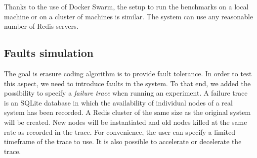 Thanks to the use of Docker Swarm, the setup to run the benchmarks on a local machine or on a cluster of machines is similar.
The system can use any reasonable number of Redis servers.

\subsection{Faults simulation}

The goal is erasure coding algorithm is to provide fault tolerance.
In order to test this aspect, we need to introduce faults in the system.
To that end, we added the possibility to specify a \textit{failure trace} when running an experiment.
A failure trace is an SQLite database in which the availability of individual nodes of a real system has been recorded.
A Redis cluster of the same size as the original system will be created.
New nodes will be instantiated and old nodes killed at the same rate as recorded in the trace.
For convenience, the user can specify a limited timeframe of the trace to use.
It is also possible to accelerate or decelerate the trace.
